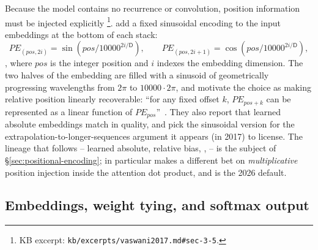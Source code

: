 Because the model contains no recurrence or convolution, position
information must be injected explicitly%
\footnote{KB excerpt: \nolinkurl{kb/excerpts/vaswani2017.md#sec-3-5}.}.
\citet{vaswani2017} add a fixed sinusoidal encoding to the input
embeddings at the bottom of each stack:
\begin{equation}
  PE_{(pos, 2i)}   = \sin(pos / 10000^{2i/\mathsf{D}}),
  \qquad
  PE_{(pos, 2i+1)} = \cos(pos / 10000^{2i/\mathsf{D}}),
  \tag{Vaswani--PE}
  \label{eq:vaswani-pe}
\end{equation}
\citep[\S 3.5]{vaswani2017}, where $pos$ is the integer position
and $i$ indexes the embedding dimension. The two halves of the
embedding are filled with a sinusoid of geometrically progressing
wavelengths from $2\pi$ to $10000 \cdot 2\pi$, and
\citet{vaswani2017} motivate the choice as making relative position
linearly recoverable: ``for any fixed offset $k$, $PE_{pos + k}$
can be represented as a linear function of $PE_{pos}$''~\citep[\S
3.5]{vaswani2017}. They also report that learned absolute embeddings
match in quality, and pick the sinusoidal version for the
extrapolation-to-longer-sequences argument it appears (in 2017) to
license. The lineage that follows -- learned absolute,  relative
bias, ,  -- is the subject of \S\ref{sec:positional-encoding};
 in particular makes a different bet on \emph{multiplicative}
position injection inside the attention dot product, and is the
2026 default.

\subsection{Embeddings, weight tying, and softmax output}
\label{sec:canonical-embed}

